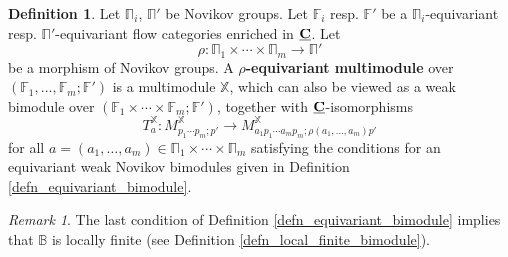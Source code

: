 \documentclass[reqno, 10pt]{amsart}
\numberwithin{equation}{section}
\numberwithin{equation}{section}
\theoremstyle{definition}
\newtheorem{defn}[thm]{Definition}
\theoremstyle{remark}
\newtheorem{rem}[thm]{Remark}
\newcommand{\beqn}{\begin{equation*}}
\newcommand{\eeqn}{\end{equation*}}
\newcommand{\mb}{\mathbb}
\newcommand{\uds}[1]{\underline{\smash{#1}}}
\begin{document}
\begin{defn}\label{defn_equivariant_multimodule}
Let $\mb\Pi_i$, $\mb\Pi'$ be Novikov groups. Let ${\mb F}_i$ resp. ${\mb F}'$ be a $\mb\Pi_i$-equivariant resp. $\mb\Pi'$-equivariant flow categories enriched in $\uds{\bf C}$. Let 
\beqn
\rho: \mb\Pi_1 \times \cdots \times \mb\Pi_m \to \mb\Pi'
\eeqn
be a morphism of Novikov groups. A {\bf $\rho$-equivariant multimodule} over $({\mb F}_1, \ldots, {\mb F}_m; {\mb F}')$ is a multimodule ${\mb X}$, which can also be viewed as a weak bimodule over $({\mb F}_1\times \cdots \times {\mb F}_m; {\mb F}')$, together with $\uds{\bf C}$-isomorphisms
\beqn
T_a^{\mb X}: M_{p_1 \cdots p_m; p'}^{{\mb X}} \to M_{a_1 p_1 \cdots a_m p_m; \rho(a_1, \ldots, a_m) p'}^{\mb X}
\eeqn
for all $a = (a_1, \ldots, a_m) \in \mb\Pi_1 \times \cdots \times \mb\Pi_m$ satisfying the conditions for an equivariant weak Novikov bimodules given in Definition \ref{defn_equivariant_bimodule}. 
\end{defn}

\begin{rem}
The last condition of Definition \ref{defn_equivariant_bimodule} implies that ${\mb B}$ is locally finite (see Definition \ref{defn_local_finite_bimodule}).
\end{rem}
\end{document}
